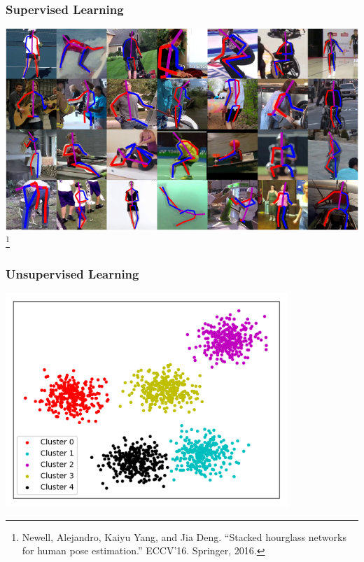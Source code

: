 \documentclass[\beamerclass]{beamer}
\newcommand\blfootnote[1]{%
  \begingroup
  \renewcommand\thefootnote{}\footnote{#1}%
  \addtocounter{footnote}{-1}%
  \endgroup
}
\begin{document}
\begin{frame}[fragile]\frametitle{Supervised Learning}
\begin{center}
  \includegraphics[width=.9\textwidth]{figs/SL.pdf}
  \blfootnote{Newell, Alejandro, Kaiyu Yang, and Jia Deng. ``Stacked hourglass networks for human pose estimation.'' ECCV'16. Springer, 2016.}
\end{center}
\end{frame}

\begin{frame}[fragile]\frametitle{Unsupervised Learning}
\begin{center}
  \includegraphics[width=0.8\textwidth]{figs/k-means.png}
\end{center}
\end{frame}
\end{document}
